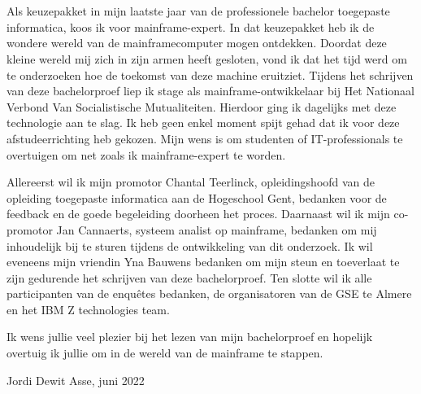 
\chapter*{}
\label{ch:voorwoord}


Als keuzepakket in mijn laatste jaar van de professionele bachelor toegepaste informatica, koos ik voor mainframe-expert. In dat keuzepakket heb ik de wondere wereld van de mainframecomputer mogen ontdekken. Doordat deze kleine wereld mij zich in zijn armen heeft gesloten, vond ik dat het tijd werd om te onderzoeken hoe de toekomst van deze machine eruitziet. Tijdens het schrijven van deze bachelorproef liep ik stage als mainframe-ontwikkelaar bij Het Nationaal Verbond Van Socialistische Mutualiteiten. Hierdoor ging ik dagelijks met deze technologie aan te slag. Ik heb geen enkel moment spijt gehad dat ik voor deze afstudeerrichting heb gekozen. Mijn wens is om studenten of IT-professionals te overtuigen om net zoals ik mainframe-expert te worden. 

Allereerst wil ik mijn promotor Chantal Teerlinck, opleidingshoofd van de opleiding toegepaste informatica aan de Hogeschool Gent, bedanken voor de feedback en de goede begeleiding doorheen het proces. Daarnaast wil ik mijn co-promotor Jan Cannaerts,  systeem analist op mainframe, bedanken om mij inhoudelijk bij te sturen tijdens de ontwikkeling van dit onderzoek. Ik wil eveneens mijn vriendin Yna Bauwens bedanken om mijn steun en toeverlaat te zijn gedurende het schrijven van deze bachelorproef. Ten slotte wil ik alle participanten van de enquêtes bedanken, de organisatoren van de GSE te Almere en het IBM Z technologies team. 

Ik wens jullie veel plezier bij het lezen van mijn bachelorproef en hopelijk overtuig ik jullie om in de wereld van de mainframe te stappen. 

Jordi Dewit \newline
Asse, juni 2022